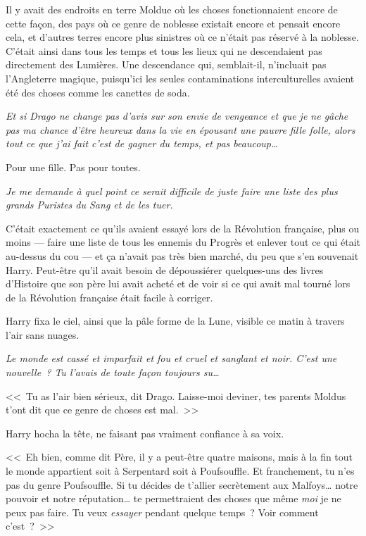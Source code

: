 Il y avait des endroits en terre Moldue où les choses fonctionnaient encore de cette façon, des pays où ce genre de noblesse existait encore et pensait encore cela, et d'autres terres encore plus sinistres où ce n'était pas réservé à la noblesse. C'était ainsi dans tous les temps et tous les lieux qui ne descendaient pas directement des Lumières. Une descendance qui, semblait-il, n'incluait pas l'Angleterre magique, puisqu'ici les seules contaminations interculturelles avaient été des choses comme les canettes de soda.

\emph{Et si Drago ne change pas d'avis sur son envie de vengeance et que je ne gâche pas ma chance d'être heureux dans la vie en épousant une pauvre fille folle, alors tout ce que j'ai fait c'est de gagner du temps, et pas beaucoup…}

Pour une fille. Pas pour toutes.

\emph{Je me demande à quel point ce serait difficile de juste faire une liste des plus grands Puristes du Sang et de les tuer.}

C'était exactement ce qu'ils avaient essayé lors de la Révolution française, plus ou moins — faire une liste de tous les ennemis du Progrès et enlever tout ce qui était au-dessus du cou — et ça n'avait pas très bien marché, du peu que s'en souvenait Harry. Peut-être qu'il avait besoin de dépoussiérer quelques-uns des livres d'Histoire que son père lui avait acheté et de voir si ce qui avait mal tourné lors de la Révolution française était facile à corriger.

Harry fixa le ciel, ainsi que la pâle forme de la Lune, visible ce matin à travers l'air sans nuages.

\emph{Le monde est cassé et imparfait et fou et cruel et sanglant et noir. C'est une nouvelle~? Tu l'avais de toute façon toujours su…}

<<~Tu as l'air bien sérieux, dit Drago. Laisse-moi deviner, tes parents Moldus t'ont dit que ce genre de choses est mal.~>>

Harry hocha la tête, ne faisant pas vraiment confiance à sa voix.

<<~Eh bien, comme dit Père, il y a peut-être quatre maisons, mais à la fin tout le monde appartient soit à Serpentard soit à Poufsouffle. Et franchement, tu n'es pas du genre Poufsouffle. Si tu décides de t'allier secrètement aux Malfoys… notre pouvoir et notre réputation… te permettraient des choses que même \emph{moi} je ne peux pas faire. Tu veux \emph{essayer} pendant quelque temps~? Voir comment c'est~?~>>

